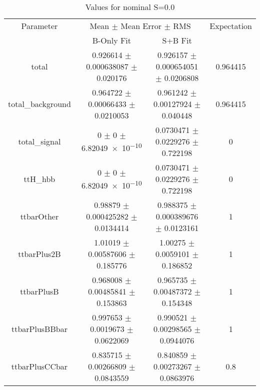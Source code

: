 \begin{table}
\centering
\caption{Values for nominal S=0.0}
\begin{tabular}{cccc}
\toprule
Parameter & \multicolumn{2}{c}{Mean $\pm$ Mean Error $\pm$ RMS} & Expectation\\
 & B-Only Fit & S+B Fit & \\
\midrule
total & \num{0.926614} $\pm$ \num{0.000638087} $\pm$ \num{0.020176} & \num{0.926157} $\pm$ \num{0.000654051} $\pm$ \num{0.0206808} & \num{0.964415}\\
total\_background & \num{0.964722} $\pm$ \num{0.00066433} $\pm$ \num{0.0210053} & \num{0.961242} $\pm$ \num{0.00127924} $\pm$ \num{0.040448} & \num{0.964415}\\
total\_signal & \num{0} $\pm$ \num{0} $\pm$ \num{6.82049e-10} & \num{0.0730471} $\pm$ \num{0.0229276} $\pm$ \num{0.722198} & \num{0}\\
ttH\_hbb & \num{0} $\pm$ \num{0} $\pm$ \num{6.82049e-10} & \num{0.0730471} $\pm$ \num{0.0229276} $\pm$ \num{0.722198} & \num{0}\\
ttbarOther & \num{0.98879} $\pm$ \num{0.000425282} $\pm$ \num{0.0134414} & \num{0.988375} $\pm$ \num{0.000389676} $\pm$ \num{0.0123161} & \num{1}\\
ttbarPlus2B & \num{1.01019} $\pm$ \num{0.00587606} $\pm$ \num{0.185776} & \num{1.00275} $\pm$ \num{0.0059101} $\pm$ \num{0.186852} & \num{1}\\
ttbarPlusB & \num{0.968008} $\pm$ \num{0.00485841} $\pm$ \num{0.153863} & \num{0.965735} $\pm$ \num{0.00487372} $\pm$ \num{0.154348} & \num{1}\\
ttbarPlusBBbar & \num{0.997653} $\pm$ \num{0.0019673} $\pm$ \num{0.0622069} & \num{0.990521} $\pm$ \num{0.00298565} $\pm$ \num{0.0944076} & \num{1}\\
ttbarPlusCCbar & \num{0.835715} $\pm$ \num{0.00266809} $\pm$ \num{0.0843559} & \num{0.840859} $\pm$ \num{0.00273267} $\pm$ \num{0.0863976} & \num{0.8}\\
\bottomrule
\end{tabular}
\end{table}